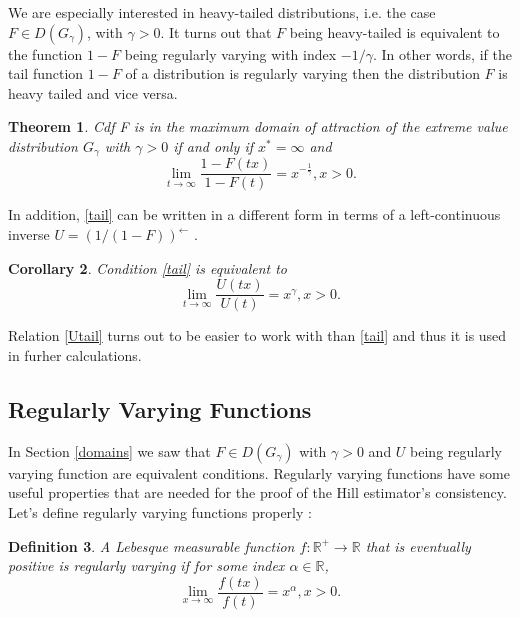 \documentclass[english,12pt,a4paper,pdftex,sci,utf8]{aaltothesis} %
\newtheorem{theorem}{Theorem}[section]
\newtheorem{corollary}[theorem]{Corollary}
\newtheorem{definition}[theorem]{Definition}
\begin{document}
We are especially interested in heavy-tailed distributions, i.e. the case $F \in D(G_{\gamma})$, with $\gamma>0$. It turns out that $F$ being heavy-tailed is equivalent to the function $1-F$ being regularly varying with index $-1/ \gamma$. In other words, if the tail function $1-F$ of a distribution is regularly varying then the distribution $F$ is heavy tailed and vice versa. \cite{deHaan}

\begin{theorem}
Cdf F is in the maximum domain of attraction of the extreme value distribution $G_{\gamma}$ with $\gamma>0$ if and only if $x^*=\infty$ and
\begin{equation}
\lim_{t\rightarrow \infty} \frac{1-F(tx)}{1-F(t)} = x^{-\frac{1}{\gamma}}, x>0.
\label{tail}
\end{equation}
\end{theorem}

In addition, \eqref{tail} can be written in a different form in terms of a left-continuous inverse $U=(1/(1-F))^{\leftarrow}$ \cite{deHaan}.

\begin{corollary}
Condition \eqref{tail} is equivalent to
\begin{equation}
\lim_{t \rightarrow \infty} \frac{U(tx)}{U(t)} = x^{\gamma}, x>0.
\label{Utail}
\end{equation}
\end{corollary}

Relation \eqref{Utail} turns out to be easier to work with than \eqref{tail} and thus it is used in furher calculations.


\subsection{Regularly Varying Functions}

In Section \ref{domains} we saw that $F \in D(G_{\gamma})$ with $\gamma>0$ and $U$ being regularly varying function are equivalent conditions. Regularly varying functions have some useful properties that are needed for the proof of the Hill estimator's consistency. Let's define regularly varying functions properly \cite{deHaan}:
\begin{definition}
A Lebesque measurable function $f: \mathbb{R}^{+} \rightarrow \mathbb{R}$ that is eventually positive is regularly varying if for some index $\alpha \in \mathbb{R}$,
\begin{equation}
\lim_{x \rightarrow \infty} \frac{f(tx)}{f(t)} = x^{\alpha}, x>0.
\label{regular}
\end{equation}
\label{regularDef}
\end{definition}
\end{document}
